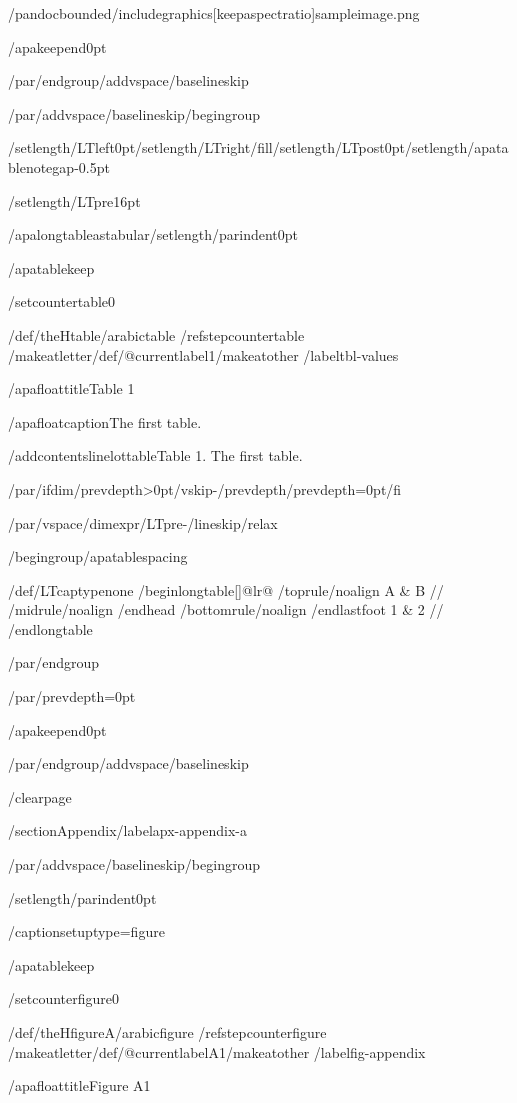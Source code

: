 /pandocbounded{/includegraphics[keepaspectratio]{sampleimage.png}}

/apakeepend{0pt}

/par/endgroup/addvspace{/baselineskip}

/par/addvspace{/baselineskip}/begingroup

/setlength{/LTleft}{0pt}/setlength{/LTright}{/fill}/setlength{/LTpost}{0pt}/setlength{/apatablenotegap}{-0.5pt}

/setlength{/LTpre}{16pt}

/apalongtableastabular/setlength{/parindent}{0pt}

/apatablekeep

/setcounter{table}{0}

/def/theHtable{/arabic{table}}%
/refstepcounter{table}%
/makeatletter/def/@currentlabel{1}/makeatother%
/label{tbl-values}

/apafloattitle{Table 1}

/apafloatcaption{The first table.}

/addcontentsline{lot}{table}{Table 1. The first table.}

/par/ifdim/prevdepth>0pt/vskip-/prevdepth/prevdepth=0pt/fi

/par/vspace{/dimexpr/LTpre-/lineskip/relax}

/begingroup/apatablespacing

{/def/LTcaptype{none} %
/begin{longtable}[]{@{}lr@{}}
/toprule/noalign{}
A & B //
/midrule/noalign{}
/endhead
/bottomrule/noalign{}
/endlastfoot
1 & 2 //
/end{longtable}
}

/par/endgroup

/par/prevdepth=0pt

/apakeepend{0pt}

/par/endgroup/addvspace{/baselineskip}

/clearpage

/section{Appendix}/label{apx-appendix-a}

/par/addvspace{/baselineskip}/begingroup

/setlength{/parindent}{0pt}

/captionsetup{type=figure}

/apatablekeep

/setcounter{figure}{0}

/def/theHfigure{A/arabic{figure}}%
/refstepcounter{figure}%
/makeatletter/def/@currentlabel{A1}/makeatother%
/label{fig-appendix}

/apafloattitle{Figure A1}

